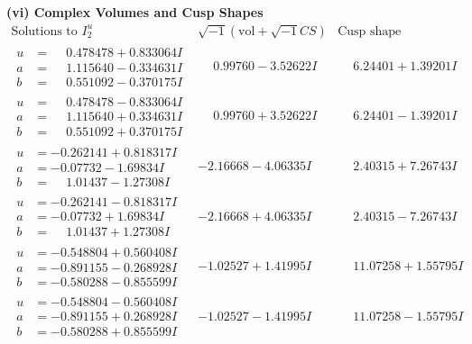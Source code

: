\documentclass[1p]{elsarticle_modified}
\theoremstyle{definition}
\newcommand{\I}{\sqrt{-1}}
\begin{document}
\newpage\flushleft \textbf{(vi) Complex Volumes and Cusp Shapes}
$$\begin{array}{c|c|c}  
\text{Solutions to }I^u_{2}& \I (\text{vol} + \sqrt{-1}CS) & \text{Cusp shape}\\
 \hline 
\begin{aligned}
u &= \phantom{-}0.478478 + 0.833064 I \\
a &= \phantom{-}1.115640 - 0.334631 I \\
b &= \phantom{-}0.551092 - 0.370175 I\end{aligned}
 & \phantom{-}0.99760 - 3.52622 I & \phantom{-}6.24401 + 1.39201 I \\ \hline\begin{aligned}
u &= \phantom{-}0.478478 - 0.833064 I \\
a &= \phantom{-}1.115640 + 0.334631 I \\
b &= \phantom{-}0.551092 + 0.370175 I\end{aligned}
 & \phantom{-}0.99760 + 3.52622 I & \phantom{-}6.24401 - 1.39201 I \\ \hline\begin{aligned}
u &= -0.262141 + 0.818317 I \\
a &= -0.07732 - 1.69834 I \\
b &= \phantom{-}1.01437 - 1.27308 I\end{aligned}
 & -2.16668 - 4.06335 I & \phantom{-}2.40315 + 7.26743 I \\ \hline\begin{aligned}
u &= -0.262141 - 0.818317 I \\
a &= -0.07732 + 1.69834 I \\
b &= \phantom{-}1.01437 + 1.27308 I\end{aligned}
 & -2.16668 + 4.06335 I & \phantom{-}2.40315 - 7.26743 I \\ \hline\begin{aligned}
u &= -0.548804 + 0.560408 I \\
a &= -0.891155 - 0.268928 I \\
b &= -0.580288 - 0.855599 I\end{aligned}
 & -1.02527 + 1.41995 I & \phantom{-}11.07258 + 1.55795 I \\ \hline\begin{aligned}
u &= -0.548804 - 0.560408 I \\
a &= -0.891155 + 0.268928 I \\
b &= -0.580288 + 0.855599 I\end{aligned}
 & -1.02527 - 1.41995 I & \phantom{-}11.07258 - 1.55795 I \\ \hline\begin{aligned}

\end{aligned}
\end{array}$$
\end{document}
